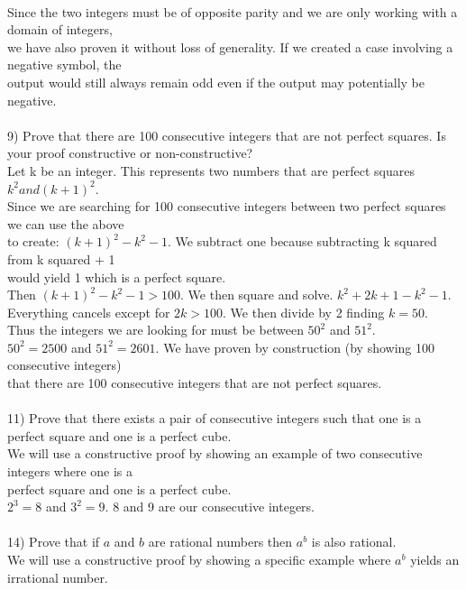 \documentclass{article}
\begin{document}
\begin{flushleft}
~\\Since the two integers must be of opposite parity and we are only working with a domain of integers, \\we have also proven it without loss of generality.  If we created a case involving a negative symbol, the \\output would still always remain odd even if the output may potentially be negative.\\

~\\
\setlength\parindent{0pt}9) Prove that there are 100 consecutive integers that are not perfect squares.  Is your proof constructive or non-constructive? \\
\setlength\parindent{24pt} Let k be an integer.  This represents two numbers that are perfect squares $k^2 and (k+1)^2$.\\
\setlength\parindent{24pt} Since we are searching for 100 consecutive integers between two perfect squares we can use the above\\ to create: $(k+1)^2 - k^2 -1$.  We subtract one because subtracting k squared from k squared + 1 \\would yield 1 which is a perfect square. \\
\setlength\parindent{24pt} Then $(k+1)^2 - k^2 -1 > 100$.  We then square and solve. $k^2 + 2k + 1 - k^2 - 1$.\\
\setlength\parindent{24pt} Everything cancels except for $2k > 100$.  We then divide by 2 finding $k = 50$.\\
\setlength\parindent{24pt} Thus the integers we are looking for must be between $50^2$ and $51^2$.  \\
\setlength\parindent{24pt} $50^2 = 2500$ and $51^2 = 2601$.  We have proven by construction (by showing 100 consecutive integers) \\that there are 100 consecutive integers that are not perfect squares.\\
~\\
\setlength\parindent{0pt}11) Prove that there exists a pair of consecutive integers such that one is a perfect square and one is a perfect cube.\\
\setlength\parindent{24pt} We will use a constructive proof by showing an example of two consecutive integers where one is a\\ perfect square and one is a perfect cube.\\
\setlength\parindent{24pt} $2^3 = 8$ and $3^2 = 9$.  8 and 9 are our consecutive integers.\\
~\\
\setlength\parindent{0pt}14) Prove that if $a$ and $b$ are rational numbers then $a^b$ is also rational.\\
\setlength\parindent{24pt} We will use a constructive proof by showing a specific example where $a^b$ yields an irrational number.\\


\end{flushleft}
\end{document}
